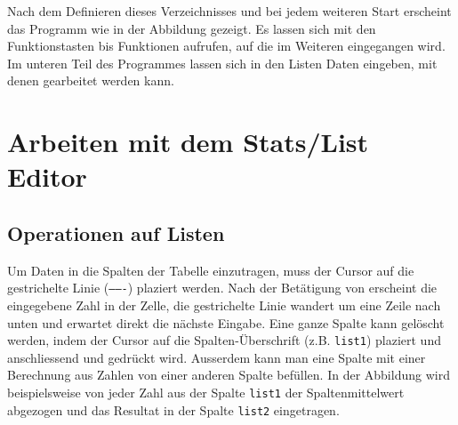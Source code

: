 \documentclass[a4paper,11pt,notitlepage,halfparskip,headsepline,normalheadings,twoside]{scrartcl}
\newlength{\tikey}
\newcommand{\keystroke}[1]{\settowidth{\tikey}{\scriptsize #1}\psframebox[framearc=0.2]{\parbox{\tikey}{\scriptsize\textsf{#1}}}}
\begin{document}
\begin{window}
Nach dem Definieren dieses Verzeichnisses und bei jedem weiteren Start erscheint
das Programm wie in der Abbildung gezeigt. Es lassen sich mit den
Funktionstasten \keystroke{F1} bis \keystroke{F7} Funktionen aufrufen, auf die
im Weiteren eingegangen wird. Im unteren Teil des Programmes lassen sich in den
Listen Daten eingeben, mit denen gearbeitet werden kann.
\end{window}

\section{Arbeiten mit dem Stats/List Editor}

\subsection{Operationen auf Listen}
\begin{window}
Um Daten in die Spalten der Tabelle einzutragen, muss der Cursor auf die
gestrichelte Linie (\texttt{-------}) plaziert werden. Nach der Betätigung von
\keystroke{ENTER} erscheint die eingegebene Zahl in der Zelle,
die gestrichelte Linie wandert um eine Zeile nach unten und erwartet direkt die
nächste Eingabe. Eine ganze Spalte kann gelöscht werden, indem der Cursor auf
die Spalten-Überschrift (z.B. \texttt{list1}) plaziert und anschliessend
\keystroke{CLEAR} und \keystroke{ENTER} gedrückt wird. Ausserdem kann man eine
Spalte mit einer Berechnung aus Zahlen von einer anderen Spalte befüllen. In der
Abbildung wird beispielsweise von jeder Zahl aus der Spalte \texttt{list1} der
Spaltenmittelwert abgezogen und das Resultat in der Spalte \texttt{list2}
eingetragen.
\end{window}
\end{document}

